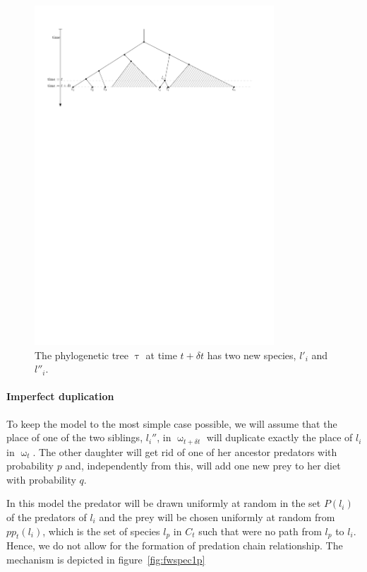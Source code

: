 \documentclass[12pt,a4paper]{report}
\begin{document}
\begin{figure}[h]
	\centering
		\includegraphics[width=0.8\textwidth]{images/phylogenydeltat}
		\caption{The phylogenetic tree $\uptau$ at time $t + \delta t$ has two new species, $l'_i$ and $l''_i$.}
		\label{fig:phylogenydeltat}
\end{figure}

\paragraph{Imperfect duplication}

To keep the model to the most simple case possible, we will assume that the place of one of the two siblings, $l_i''$, in $\upomega_{t + \delta t}$ will duplicate exactly the place of $l_i$ in $\upomega_t$. The other daughter will get rid of one of her ancestor predators with probability $p$ and, independently from this, will add one new prey to her diet with probability $q$.

In this model the predator will be drawn uniformly at random in the set $P(l_i)$ of the predators of $l_i$ and the prey will be chosen uniformly at random from $pp_{t}(l_i)$, which is the set of species $l_p$ in $C_t$ such that were no path from $l_p$ to $l_i$. Hence, we do not allow for the formation of predation chain relationship. The mechanism is depicted in figure~\ref{fig:fwspec1p}
\end{document}
